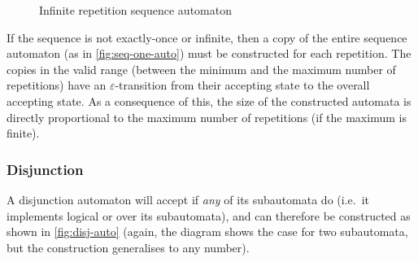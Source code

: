 \begin{figure}[ht]
  \centering
  \caption{Infinite repetition sequence automaton}
  \label{fig:seq-inf-auto}
\end{figure}

If the sequence is not exactly-once or infinite, then a copy of the entire
sequence automaton (as in \autoref{fig:seq-one-auto}) must be constructed for
each repetition. The copies in the valid range (between the minimum and the
maximum number of repetitions) have an $\varepsilon$-transition from their
accepting state to the overall accepting state. As a consequence of this, the
size of the constructed automata is directly proportional to the maximum number
of repetitions (if the maximum is finite).

\subsubsection{Disjunction}

A disjunction automaton will accept if \emph{any} of its subautomata do (i.e.\
it implements logical or over its subautomata), and can therefore be constructed
as shown in \autoref{fig:disj-auto} (again, the diagram shows the case for two
subautomata, but the construction generalises to any number).

